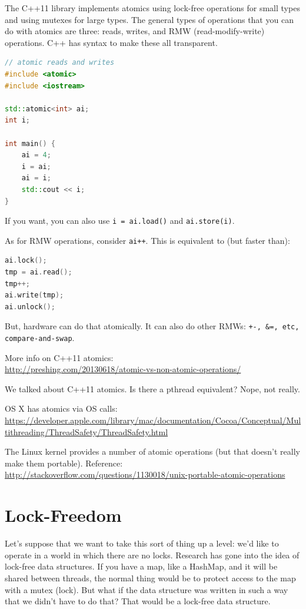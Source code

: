 \documentclass[a4paper]{report}
\begin{document}
The C++11 library implements atomics using lock-free operations for small types
and using mutexes for large types. The general types of operations that you can do with atomics are three: reads, writes, and RMW (read-modify-write) operations. C++ has syntax to make these all transparent.

\begin{lstlisting}[language=C++]
// atomic reads and writes
#include <atomic>
#include <iostream>

std::atomic<int> ai;
int i;

int main() {
    ai = 4;
    i = ai;
    ai = i;
    std::cout << i;
}
\end{lstlisting}
If you want, you can also use {\tt i = ai.load()} and {\tt ai.store(i)}.

As for RMW operations, consider {\tt ai++}. This is equivalent to (but faster than):

\begin{lstlisting}[language=C++]
ai.lock();
tmp = ai.read(); 
tmp++; 
ai.write(tmp);
ai.unlock();
\end{lstlisting}
But, hardware can do that atomically. It can also do other RMWs: {\tt +-, \&=, etc, compare-and-swap}.

More info on C++11 atomics:\\
\url{http://preshing.com/20130618/atomic-vs-non-atomic-operations/}

We talked about C++11 atomics. Is there a pthread equivalent? Nope, not really.

OS X has atomics via OS calls: \\
\url{https://developer.apple.com/library/mac/documentation/Cocoa/Conceptual/Multithreading/ThreadSafety/ThreadSafety.html}

The Linux kernel provides a number of atomic operations (but that doesn't really make them portable). Reference:
\url{http://stackoverflow.com/questions/1130018/unix-portable-atomic-operations}

\section*{Lock-Freedom}

Let's suppose that we want to take this sort of thing up a level: we'd like to operate in a world in which there are no locks. Research has gone into the idea of lock-free data structures. If you have a map, like a HashMap, and it will be shared between threads, the normal thing would be to protect access to the map with a mutex (lock). But what if the data structure was written in such a way that we didn't have to do that? That would be a lock-free data structure.
\end{document}
